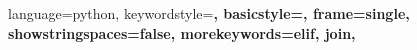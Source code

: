 
{
    language=python,
    keywordstyle=\bfseries,
    basicstyle=\footnotesize,
    frame=single,
    showstringspaces=false,
    morekeywords={elif, join},
}


